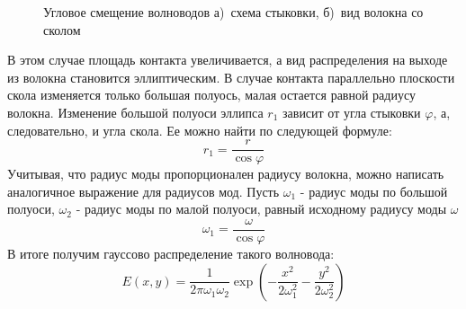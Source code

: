 \begin{figure}[h!]
	\begin{minipage}[h]{0.49\linewidth}
	\end{minipage}
	\hfill
	\begin{minipage}[h]{0.49\linewidth}
	\end{minipage}
	\caption{Угловое смещение волноводов а)~схема стыковки, б)~вид волокна со сколом}
	\label{angular_movement}
\end{figure}

В этом случае площадь контакта увеличивается, а вид распределения на выходе из волокна становится эллиптическим. В случае контакта параллельно плоскости скола изменяется только большая полуось, малая остается равной радиусу волокна. Изменение большой полуоси эллипса $r_1$ зависит от угла стыковки $\varphi$, а, следовательно, и угла скола. Ее можно найти по следующей формуле:
\begin{equation}
	r_1 = \frac{r}{\cos \varphi}
	\label{ellipse_axis}
\end{equation}
Учитывая, что радиус моды пропорционален радиусу волокна, можно написать аналогичное выражение для радиусов мод. Пусть $\omega_1$ - радиус моды по большой полуоси, $\omega_2$ - радиус моды по малой полуоси, равный исходному радиусу моды $\omega$
\begin{equation}
	\omega_1 = \frac{\omega}{\cos \varphi}
	\label{ellipse_axis}
\end{equation}
В итоге получим гауссово распределение такого волновода:
\begin{equation}
  E(x,y)=\frac{1}{2\pi\omega_1\omega_2}\exp\left(-\frac{x^2}{2\omega_1^2}-\frac{y^2}{2\omega_2^2}\right)
\end{equation}